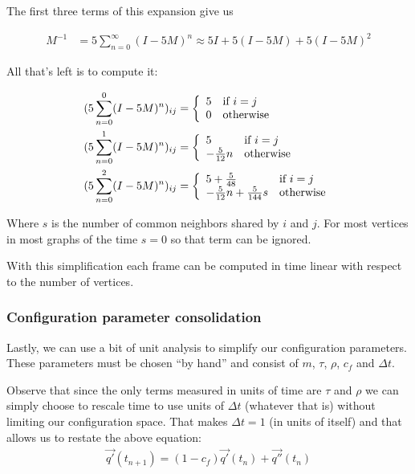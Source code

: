 \documentclass{article}
\begin{document}
The first three terms of this expansion give us 

\begin{align*}
M^{-1} &= 5\sum_{n=0}^{\infty} (I - 5M)^{n} \approx 5I + 5(I - 5M) + 5(I-5M)^2
\end{align*}

All that's left is to compute it:

\begin{align*}
(5\sum_{n=0}^{0} (I - 5M)^{n})_{ij}  &= \left\{ 
  \begin{array}{l l}
    5 & \text{if $i=j$}\\
    0 & \text{otherwise}\\
  \end{array} \right. \\
(5\sum_{n=0}^{1} (I -5 M)^{n})_{ij}  &= \left\{ 
  \begin{array}{l l}
    5 & \text{if $i=j$}\\
    -\frac{5}{12}n & \text{otherwise}\\
  \end{array} \right. \\
(5\sum_{n=0}^{2} (I - 5M)^{n})_{ij}  &= \left\{ 
  \begin{array}{l l}
    5+\frac{5}{48} & \text{if $i=j$}\\
    -\frac{5}{12}n+\frac{5}{144}s & \text{otherwise}\\
  \end{array} \right. \\
\end{align*}

Where $s$ is the number of common neighbors shared by $i$ and $j$. For most vertices 
in most graphs of the time $s=0$ so that term can be ignored.

With this simplification each frame can be computed in time linear with respect to the number of vertices.
\subsubsection{Configuration parameter consolidation}
Lastly, we can use a bit of unit analysis to simplify our configuration
parameters. These parameters must be chosen ``by hand'' and consist of $m$,
$\tau$, $\rho$, $c_f$ and $\Delta t$. 

Observe that since the only terms measured in units of time are $\tau$ and
$\rho$ we can simply choose to rescale time to use units of $\Delta t$ 
(whatever that is) without limiting our configuration space. That makes $\Delta
t=1$ (in units of itself) and that allows us to restate the above equation:
\begin{align*}
\vec{q'}(t_{n+1}) = \left(1- c_f\right)\vec{q'}(t_n)+ \vec{q''}(t_n)
\end{align*} 
\end{document}
